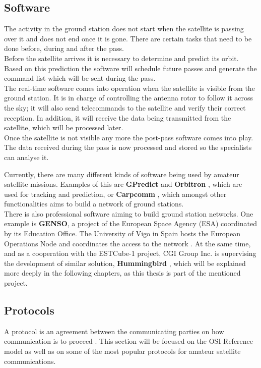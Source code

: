 \subsection{Software}
The activity in the ground station does not start when the satellite is passing over it and does not end once it is gone. There are certain tasks that need to be done before, during and after the pass.\\

Before the satellite arrives it is necessary to determine and predict its orbit. Based on this prediction the software will schedule future passes and generate the command list which will be sent during the pass.\\

The real-time software comes into operation when the satellite is visible from the ground station. It is in charge of controlling the antenna rotor to follow it across the sky; it will also send telecommands to the satellite and verify their correct reception. In addition, it will receive the data being transmitted from the satellite, which will be processed later.\\

Once the satellite is not visible any more the post-pass software comes into play. The data received during the pass is now processed and stored so the specialists can analyse it.


Currently, there are many different kinds of software being used by amateur satellite missions. Examples of this are \textbf{GPredict} \cite{GPredict} and \textbf{Orbitron} \cite{Orbitron}, which are used for tracking and prediction, or \textbf{Carpcomm} \cite{Carpcomm}, which amongst other functionalities aims to build a network of ground stations.\\

There is also professional software aiming to build ground station networks. One example is \textbf{GENSO}, a project of the European Space Agency (ESA) coordinated by its Education Office. The University of Vigo in Spain hosts the European Operations Node and coordinates the access to the network \cite{GENSO}. At the same time, and as a cooperation with the ESTCube-1 project, CGI Group Inc. is supervising the development of similar solution, \textbf{Hummingbird} \cite{CGI}, which will be explained more deeply in the following chapters, as this thesis is part of the mentioned project.


\subsection{Protocols}
A protocol is an agreement between the communicating parties on how communication is to proceed \cite{Tanenbaum}. This section will be focused on the OSI Reference model as well as on some of the most popular protocols for amateur satellite communications.

